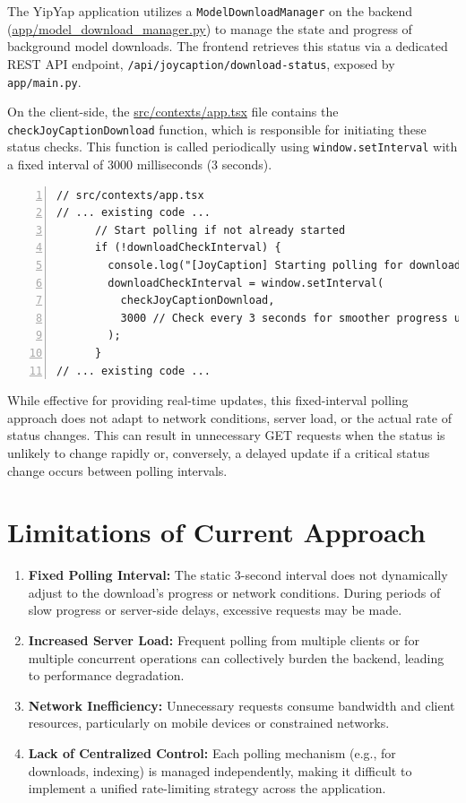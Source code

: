 \documentclass[10pt]{article}
\begin{document}
The YipYap application utilizes a \texttt{ModelDownloadManager} on the backend (\url{app/model\_download\_manager.py}) to manage the state and progress of background model downloads. The frontend retrieves this status via a dedicated REST API endpoint, \texttt{/api/joycaption/download-status}, exposed by \texttt{app/main.py}.

On the client-side, the \url{src/contexts/app.tsx} file contains the \texttt{checkJoyCaptionDownload} function, which is responsible for initiating these status checks. This function is called periodically using \texttt{window.setInterval} with a fixed interval of 3000 milliseconds (3 seconds).

\begin{lstlisting}[language=TeX, basicstyle=\small\ttfamily, numbers=left, xleftmargin=1em, xrightmargin=1em, breaklines=true]
// src/contexts/app.tsx
// ... existing code ...
      // Start polling if not already started
      if (!downloadCheckInterval) {
        console.log("[JoyCaption] Starting polling for download status.");
        downloadCheckInterval = window.setInterval(
          checkJoyCaptionDownload,
          3000 // Check every 3 seconds for smoother progress updates
        );
      }
// ... existing code ...
\end{lstlisting}

While effective for providing real-time updates, this fixed-interval polling approach does not adapt to network conditions, server load, or the actual rate of status changes. This can result in unnecessary GET requests when the status is unlikely to change rapidly or, conversely, a delayed update if a critical status change occurs between polling intervals.

\section{Limitations of Current Approach}

\begin{enumerate}
    \item \textbf{Fixed Polling Interval:} The static 3-second interval does not dynamically adjust to the download's progress or network conditions. During periods of slow progress or server-side delays, excessive requests may be made.
    \item \textbf{Increased Server Load:} Frequent polling from multiple clients or for multiple concurrent operations can collectively burden the backend, leading to performance degradation.
    \item \textbf{Network Inefficiency:} Unnecessary requests consume bandwidth and client resources, particularly on mobile devices or constrained networks.
    \item \textbf{Lack of Centralized Control:} Each polling mechanism (e.g., for downloads, indexing) is managed independently, making it difficult to implement a unified rate-limiting strategy across the application.
\end{enumerate}
\end{document}
